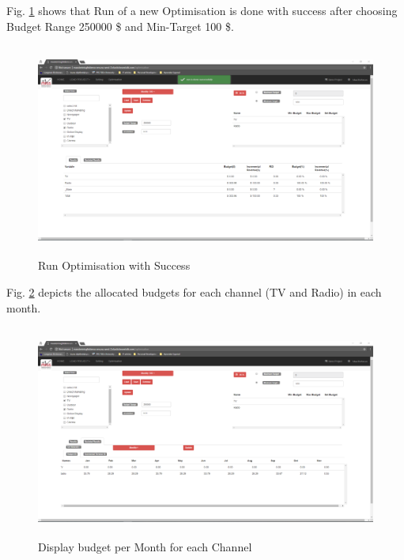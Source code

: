Fig. \ref{ROWSscreentshots} shows that Run of a new Optimisation is done with success after choosing Budget Range 250000 \$ and Min-Target 100 \$.    
\begin{figure}[!h]
	\centering
	\includegraphics[width=17cm,height=7cm]{7.png}
	\caption{Run Optimisation with Success }
	\label{ROWSscreentshots}	
\end{figure} 
\clearpage
\newpage 
Fig. \ref{DBMCscreentshots} depicts the allocated budgets for each channel (TV and Radio) in each month.
\begin{figure}[!h]
	\centering
	\includegraphics[width=17cm,height=7cm]{8.png}
	\caption{Display budget per Month for each Channel}
	\label{DBMCscreentshots}
\end{figure}

